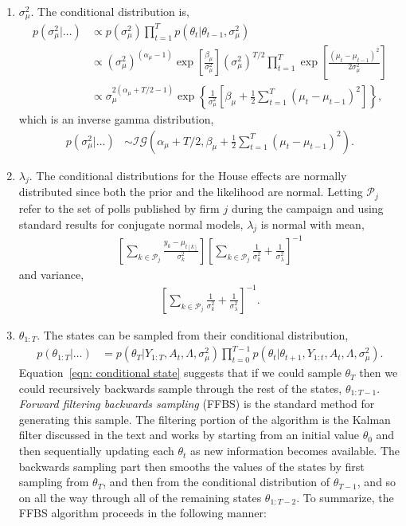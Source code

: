 \documentclass[12pt,final,fleqn]{article}
\theoremstyle{plain}
\begin{document}
\begin{enumerate}
\item $\sigma_\mu^2$. The conditional distribution is,
\begin{align}
p(\sigma_\mu^2|\ldots)&\propto p(\sigma_\mu^2) \prod_{t=1}^T p(\theta_{t}|\theta_{t-1}, \sigma_\mu^2) \\
&\propto (\sigma_\mu^2)^{(\alpha_\mu - 1)}\exp\left[\frac{\beta_\mu}{\sigma_\mu^2}\right](\sigma_\mu^2)^{T/2} \prod_{t=1}^T \exp\left[\frac{(\mu_{t} - \mu_{t-1})^2}{2\sigma_\mu^2}\right]\\
&\propto \sigma_\mu^{2(\alpha_\mu + T/2 - 1)}\exp\left\{\frac{1}{\sigma_\mu^2}\left[\beta_\mu + \frac{1}{2}\sum_{t=1}^T(\mu_{t} - \mu_{t-1})^2\right]\right\},
\end{align}
which is an inverse gamma distribution,
\begin{align}
p(\sigma_\mu^2|\ldots)&\sim \mathcal{IG}\left(\alpha_\mu + T/2, \beta_\mu + \frac{1}{2}\sum_{t=1}^T (\mu_{t} - \mu_{t-1})^2  \right).
\end{align}
\item $\lambda_j$. The conditional distributions for the House effects are normally distributed since both the prior and the likelihood are normal. Letting $\mathcal{P}_j$ refer to the set of polls published by firm $j$ during the campaign and using standard results for conjugate normal models, $\lambda_j$ is normal with mean,
\begin{align}
\left[\sum_{k \in \mathcal{P}_j}\frac{y_k - \mu_{t[k]}}{\sigma^2_k}\right] \left[\sum_{k \in \mathcal{P}_j} \frac{1}{\sigma^2_k} + \frac{1}{\sigma^2_\lambda}\right]^{-1}
\end{align}
and variance,
\begin{align}
\left[\sum_{k \in \mathcal{P}_j} \frac{1}{\sigma^2_k} + \frac{1}{\sigma^2_\lambda}\right]^{-1}.
\end{align}
\item $\theta_{1:T}$. The states can be sampled from their conditional distribution,
\begin{align}
\label{eqn: conditional state}
p(\theta_{1:T}|\ldots)&= p(\theta_T| Y_{1:T}, A_t, \Lambda, \sigma^2_\mu) \prod_{t=0}^{T-1} p(\theta_t|\theta_{t+1}, Y_{1:t}, A_t, \Lambda, \sigma^2_\mu).
\end{align}
Equation~\ref{eqn: conditional state} suggests that if we could sample $\theta_T$ then we could recursively backwards sample through the rest of the states, $\theta_{1:T-1}$. \emph{Forward filtering backwards sampling} (FFBS) is the standard method for generating this sample. The filtering portion of the algorithm is the Kalman filter discussed in the text and works by starting from an initial value $\theta_0$ and then sequentially updating each $\theta_t$ as new information becomes available. The backwards sampling part then smooths the values of the states by first sampling from $\theta_T$, and then from the conditional distribution of $\theta_{T-1}$, and so on all the way through all of the remaining states $\theta_{1:T-2}$. To summarize, the FFBS algorithm proceeds in the following manner: 

\end{enumerate}
\end{document}
